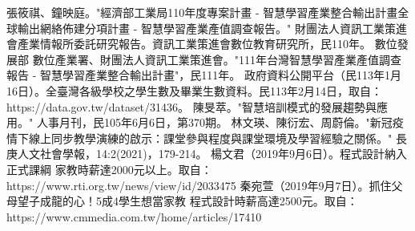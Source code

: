 \begin{thebibliography}{99}
   張筱祺、鐘映庭。"經濟部工業局110年度專案計畫 - 智慧學習產業整合輸出計畫全球輸出網絡佈建分項計畫 - 智慧學習產業產值調查報告。" 財團法人資訊工業策進會產業情報所委託研究報告。資訊工業策進會數位教育研究所，民110年。
   數位發展部 數位產業署、財團法人資訊工業策進會。"111年台灣智慧學習產業產值調查報告 - 智慧學習產業整合輸出計畫"，民111年。
   政府資料公開平台（民113年1月16日）。全臺灣各級學校之學生數及畢業生數資料。民113年2月14日，取自：https://data.gov.tw/dataset/31436。
   陳旻萃。"智慧培訓模式的發展趨勢與應用。" 人事月刊，民105年6月6日，第370期。
   林文瑛、陳衍宏、周蔚倫。"新冠疫情下線上同步教學演練的啟示：課堂參與程度與課堂環境及學習經驗之關係。" 長庚人文社會學報，14:2(2021)，179-214。
   楊文君（2019年9月6日）。程式設計納入正式課綱 家教時薪達2000元以上。取自：https://www.rti.org.tw/news/view/id/2033475
   秦宛萱（2019年9月7日）。抓住父母望子成龍的心！5成4學生想當家教 程式設計時薪高達2500元。取自：https://www.cmmedia.com.tw/home/articles/17410
\end{thebibliography} 